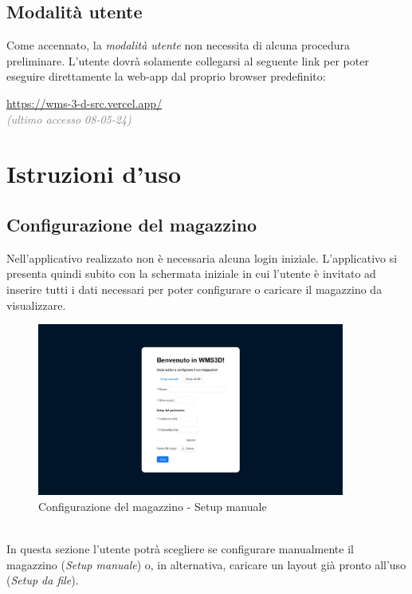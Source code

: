     \subsection{Modalità utente}\label{sec:install_run:user}
    Come accennato, la \textit{modalità utente} non necessita di alcuna procedura preliminare. L'utente dovrà solamente collegarsi al seguente link per poter eseguire direttamente la web-app dal proprio browser predefinito: 
    \begin{center}
        \url{https://wms-3-d-src.vercel.app/} \\ \textcolor{gray}{\textit{(ultimo accesso 08-05-24)}}
    \end{center}

    \newpage



    
\section{Istruzioni d'uso}\label{sec:Istruzioni_uso}

    \subsection{Configurazione del magazzino}\label{sec:creazione}
        Nell'applicativo realizzato non è necessaria alcuna login iniziale. L'applicativo si presenta quindi subito con la schermata iniziale in cui l'utente è 
        invitato ad inserire tutti i dati necessari per poter configurare o caricare il magazzino da visualizzare.
        \begin{figure}[h!]
            \centering
            \includegraphics[width=0.9\textwidth]{images/schermata_iniziale.png}
            \caption{Configurazione del magazzino - Setup manuale}
        \end{figure}\\
        \noindent In questa sezione l'utente potrà scegliere se configurare manualmente il magazzino (\textit{Setup manuale}) o, in alternativa, caricare un layout già pronto all'uso (\textit{Setup da file}).
        
